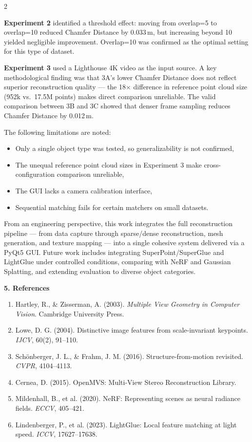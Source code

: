 \begin{multicols}{2}

\textbf{Experiment 2} identified a threshold effect: moving from overlap=5 to overlap=10 reduced Chamfer Distance by 0.033\,m, but increasing beyond 10 yielded negligible improvement. Overlap=10 was confirmed as the optimal setting for this type of dataset.

\textbf{Experiment 3} used a Lighthouse 4K video as the input source. A key methodological finding was that 3A's lower Chamfer Distance does not reflect superior reconstruction quality — the 18$\times$ difference in reference point cloud size (952k vs.\ 17.5M points) makes direct comparison unreliable. The valid comparison between 3B and 3C showed that denser frame sampling reduces Chamfer Distance by 0.012\,m.

The following limitations are noted:
\begin{itemize}
    \item Only a single object type was tested, so generalizability is not confirmed,
    \item The unequal reference point cloud sizes in Experiment 3 make cross-configuration comparison unreliable,
    \item The GUI lacks a camera calibration interface,
    \item Sequential matching fails for certain matchers on small datasets.
\end{itemize}

From an engineering perspective, this work integrates the full reconstruction pipeline — from data capture through sparse/dense reconstruction, mesh generation, and texture mapping — into a single cohesive system delivered via a PyQt5 GUI. Future work includes integrating SuperPoint/SuperGlue and LightGlue under controlled conditions, comparing with NeRF and Gaussian Splatting, and extending evaluation to diverse object categories.

\noindent\textbf{5. References}

\small
\begin{enumerate}
    \item Hartley, R., \& Zisserman, A. (2003). \textit{Multiple View Geometry in Computer Vision}. Cambridge University Press.
    \item Lowe, D. G. (2004). Distinctive image features from scale-invariant keypoints. \textit{IJCV}, 60(2), 91--110.
    \item Sch{\"o}nberger, J. L., \& Frahm, J. M. (2016). Structure-from-motion revisited. \textit{CVPR}, 4104--4113.
    \item Cernea, D. (2015). OpenMVS: Multi-View Stereo Reconstruction Library.
    \item Mildenhall, B., et al. (2020). NeRF: Representing scenes as neural radiance fields. \textit{ECCV}, 405--421.
    \item Lindenberger, P., et al. (2023). LightGlue: Local feature matching at light speed. \textit{ICCV}, 17627--17638.
\end{enumerate}
\normalsize

\end{multicols}
